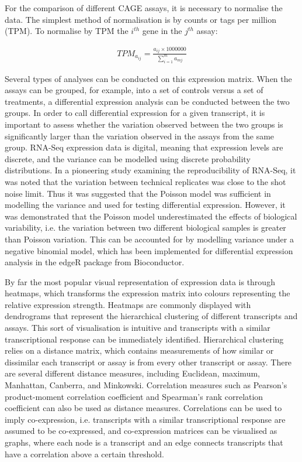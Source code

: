 For the comparison of different CAGE assays, it is necessary to normalise the data. The simplest method of normalisation is by counts or tags per million (TPM). To normalise by TPM the $i^{th}$ gene in the $j^{th}$ assay:

\begin{align*}
   TPM_{a_{ij}} = \frac{a_{ij} \times 1000000}{\sum_{i=1}^{m}{a_{mj}}}
\end{align*}

Several types of analyses can be conducted on this expression matrix. When the assays can be grouped, for example, into a set of controls versus a set of treatments, a differential expression analysis can be conducted between the two groups. In order to call differential expression for a given transcript, it is important to assess whether the variation observed between the two groups is significantly larger than the variation observed in the assays from the same group. RNA-Seq expression data is digital, meaning that expression levels are discrete, and the variance can be modelled using discrete probability distributions. In a pioneering study examining the reproducibility of RNA-Seq, it was noted that the variation between technical replicates was close to the shot noise limit\cite{pmid18550803}. Thus it was suggested that the Poisson model was sufficient in modelling the variance and used for testing differential expression. However, it was demonstrated that the Poisson model underestimated the effects of biological variability, i.e. the variation between two different biological samples is greater than Poisson variation\cite{20979621}. This can be accounted for by modelling variance under a negative binomial model, which has been implemented for differential expression analysis in the edgeR package\cite{pmid19910308} from Bioconductor\cite{pmid15461798}.

By far the most popular visual representation of expression data is through heatmaps, which transforms the expression matrix into colours representing the relative expression strength. Heatmaps are commonly displayed with dendrograms that represent the hierarchical clustering of different transcripts and assays\cite{pmid9843981}. This sort of visualisation is intuitive and transcripts with a similar transcriptional response can be immediately identified. Hierarchical clustering relies on a distance matrix, which contains measurements of how similar or dissimilar each transcript or assay is from every other transcript or assay. There are several different distance measures, including Euclidean, maximum, Manhattan, Canberra, and Minkowski. Correlation measures such as Pearson's product-moment correlation coefficient and Spearman's rank correlation coefficient can also be used as distance measures. Correlations can be used to imply co-expression, i.e. transcripts with a similar transcriptional response are assumed to be co-expressed, and co-expression matrices can be visualised as graphs, where each node is a transcript and an edge connects transcripts that have a correlation above a certain threshold.

